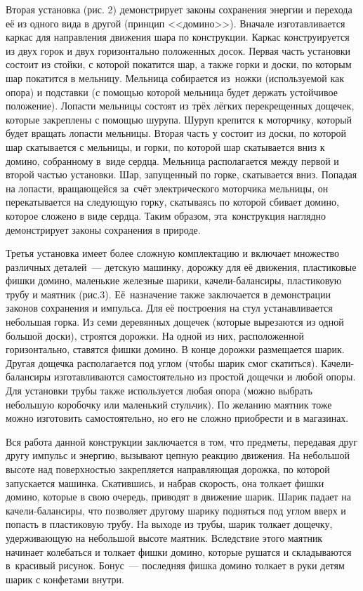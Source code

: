 Вторая установка (рис. 2) демонстрирует законы сохранения энергии и перехода её из одного вида в другой (принцип <<домино>>). Вначале изготавливается каркас для направления движения шара по конструкции. Каркас конструируется из двух горок и двух горизонтально положенных досок. Первая часть установки состоит из стойки, с которой покатится шар, а также горки и доски, по которым шар покатится в мельницу. Мельница собирается из~ножки (используемой как опора) и подставки (с помощью которой мельница будет держать устойчивое положение). Лопасти мельницы состоят из трёх лёгких перекрещенных дощечек, которые закреплены с помощью шурупа. Шуруп крепится к моторчику, который будет вращать лопасти мельницы. Вторая часть у состоит из доски, по которой шар скатывается с мельницы, и горки, по которой шар скатывается вниз к домино, собранному в~виде сердца. Мельница располагается между первой и второй частью установки.
\clearpage
Шар, запущенный по горке, скатывается вниз. Попадая на лопасти, вращающейся за~счёт электрического моторчика мельницы, он перекатывается на следующую горку, скатываясь по которой сбивает домино, которое сложено в виде сердца. Таким образом, эта~конструкция наглядно демонстрирует законы сохранения в природе.




Третья установка имеет более сложную комплектацию и включает множество различных деталей~--- детскую машинку, дорожку для её движения, пластиковые фишки домино, маленькие железные шарики, качели-балансиры, пластиковую трубу и маятник (рис.3). Её~назначение также заключается в демонстрации законов сохранения и импульса. Для её построения на стул устанавливается небольшая горка. Из семи деревянных дощечек (которые вырезаются из одной большой доски), строятся дорожки. На одной из них, расположенной горизонтально, ставятся фишки домино. В конце дорожки размещается шарик. Другая дощечка располагается под углом (чтобы шарик смог скатиться). Качели-балансиры изготавливаются самостоятельно из простой дощечки и любой опоры. Для установки трубы также используется любая опора (можно выбрать небольшую коробочку или маленький стульчик). По желанию маятник тоже можно изготовить самостоятельно, но его не сложно приобрести и в магазинах.



Вся работа данной конструкции заключается в том, что предметы, передавая друг другу импульс и энергию, вызывают цепную реакцию движения. На небольшой высоте над поверхностью закрепляется направляющая дорожка, по которой запускается машинка. Скатившись, и набрав скорость, она толкает фишки домино, которые в свою очередь, приводят в движение шарик.  Шарик падает на качели-балансиры, что позволяет другому шарику подняться под углом вверх и попасть в пластиковую трубу. На выходе из трубы, шарик толкает дощечку, удерживающую на небольшой высоте маятник. Вследствие этого маятник начинает колебаться и толкает фишки домино, которые рушатся и складываются в~красивый рисунок. Бонус~--- последняя фишка домино толкает в руки детям шарик с конфетами внутри.

